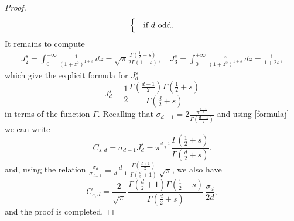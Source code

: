 \documentclass[11pt]{article}
\begin{document}
\begin{proof}
\begin{equation}
\begin{cases}
& \hbox{\rm if $d$ odd.}
\end{cases}
\end{equation}
It remains to compute 
\begin{eqnarray*}
J^s_2=\int_0^{+\infty} \frac{1}{(1+z^2)^{1+s}}\, dz=\sqrt{\pi}\frac{\Gamma(\frac{1}{2}+s)}{2\Gamma(1+s)}, \quad J^s_3=\int_0^{+\infty} \frac{z}{(1+z^2)^{1+s}}\, dz=\frac{1}{1+2s}, 
\end{eqnarray*}
which give the explicit formula for $J_d^s$
\begin{equation}\label{formulaj}
J_d^s=
\frac{1}{2}
\frac{\Gamma(\frac{d-1}{2})\Gamma(\frac{1}{2}+s)}{\Gamma(\frac{d}{2}+s)} 
\end{equation}
 in terms of the function $\Gamma$.
 Recalling that $\sigma_{d-1}=2\frac{\pi^{\frac{d-1}{2}}}{\Gamma(\frac{d-1}{2})}$ and using \eqref{formulaj} we can write
\[
C_{s,d}=\sigma_{d-1}J_d^s=\pi^{\frac{d-1}{2}} \frac{\Gamma(\frac{1}{2}+s)}{\Gamma(\frac{d}{2}+s)}.
\]
and,  using the relation $\frac{\sigma_d}{\sigma_{d-1}}
=\frac{d}{d-1}\ \frac{\Gamma(\frac{d+1}{2})}{\Gamma(\frac{d}{2}+1)}\, \sqrt\pi$,
we also have 
\[
C_{s,d}= \frac{2}{\sqrt\pi} \,
\frac{\Gamma(\frac{d}{2}+1)\Gamma(\frac{1}{2}+s)}{\Gamma(\frac{d}{2}+s)}\, \frac{\sigma_d}{2d}, 
\]
and the proof is completed.
\end{proof}
\end{document}

